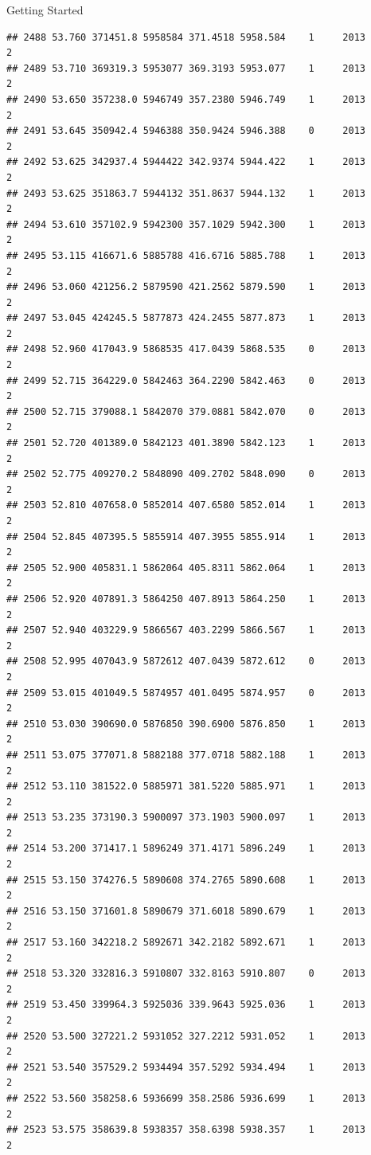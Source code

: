 \documentclass[
  ignorenonframetext,
]{beamer}
\begin{document}
\begin{frame}[fragile]{Getting Started}
\begin{verbatim}
## 2488 53.760 371451.8 5958584 371.4518 5958.584    1     2013        2
## 2489 53.710 369319.3 5953077 369.3193 5953.077    1     2013        2
## 2490 53.650 357238.0 5946749 357.2380 5946.749    1     2013        2
## 2491 53.645 350942.4 5946388 350.9424 5946.388    0     2013        2
## 2492 53.625 342937.4 5944422 342.9374 5944.422    1     2013        2
## 2493 53.625 351863.7 5944132 351.8637 5944.132    1     2013        2
## 2494 53.610 357102.9 5942300 357.1029 5942.300    1     2013        2
## 2495 53.115 416671.6 5885788 416.6716 5885.788    1     2013        2
## 2496 53.060 421256.2 5879590 421.2562 5879.590    1     2013        2
## 2497 53.045 424245.5 5877873 424.2455 5877.873    1     2013        2
## 2498 52.960 417043.9 5868535 417.0439 5868.535    0     2013        2
## 2499 52.715 364229.0 5842463 364.2290 5842.463    0     2013        2
## 2500 52.715 379088.1 5842070 379.0881 5842.070    0     2013        2
## 2501 52.720 401389.0 5842123 401.3890 5842.123    1     2013        2
## 2502 52.775 409270.2 5848090 409.2702 5848.090    0     2013        2
## 2503 52.810 407658.0 5852014 407.6580 5852.014    1     2013        2
## 2504 52.845 407395.5 5855914 407.3955 5855.914    1     2013        2
## 2505 52.900 405831.1 5862064 405.8311 5862.064    1     2013        2
## 2506 52.920 407891.3 5864250 407.8913 5864.250    1     2013        2
## 2507 52.940 403229.9 5866567 403.2299 5866.567    1     2013        2
## 2508 52.995 407043.9 5872612 407.0439 5872.612    0     2013        2
## 2509 53.015 401049.5 5874957 401.0495 5874.957    0     2013        2
## 2510 53.030 390690.0 5876850 390.6900 5876.850    1     2013        2
## 2511 53.075 377071.8 5882188 377.0718 5882.188    1     2013        2
## 2512 53.110 381522.0 5885971 381.5220 5885.971    1     2013        2
## 2513 53.235 373190.3 5900097 373.1903 5900.097    1     2013        2
## 2514 53.200 371417.1 5896249 371.4171 5896.249    1     2013        2
## 2515 53.150 374276.5 5890608 374.2765 5890.608    1     2013        2
## 2516 53.150 371601.8 5890679 371.6018 5890.679    1     2013        2
## 2517 53.160 342218.2 5892671 342.2182 5892.671    1     2013        2
## 2518 53.320 332816.3 5910807 332.8163 5910.807    0     2013        2
## 2519 53.450 339964.3 5925036 339.9643 5925.036    1     2013        2
## 2520 53.500 327221.2 5931052 327.2212 5931.052    1     2013        2
## 2521 53.540 357529.2 5934494 357.5292 5934.494    1     2013        2
## 2522 53.560 358258.6 5936699 358.2586 5936.699    1     2013        2
## 2523 53.575 358639.8 5938357 358.6398 5938.357    1     2013        2

\end{verbatim}
\end{frame}
\end{document}
